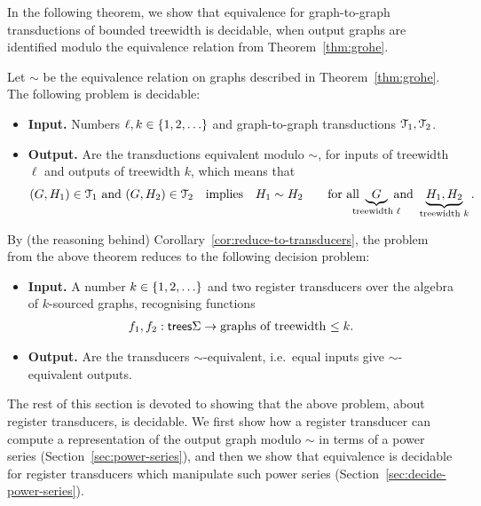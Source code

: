 In the following theorem, we show that equivalence for graph-to-graph \mso transductions of bounded treewidth is decidable, when output graphs are identified modulo the equivalence relation from Theorem~\ref{thm:grohe}. 
\begin{theorem}\label{thm:path-equivalence}
    Let $\sim$ be the equivalence relation on graphs described in Theorem~\ref{thm:grohe}. 
    The following problem is decidable:
    \begin{itemize}
        \item {\bf Input.} Numbers $\ell, k \in \{1,2,\ldots\}$ and  graph-to-graph \mso transductions $\mathcal T_1,\mathcal T_2$.
        \item {\bf Output.} Are the transductions equivalent modulo $\sim$, for inputs of treewidth $\ell$ and outputs of treewidth $k$, which means that
        \begin{align*}
        (G,H_1) \in \Tt_1 \text{ and } (G,H_2) \in \Tt_2 \quad \text{implies} \quad H_1 \sim H_2  \qquad \text{for all }\myunderbrace{G}{treewidth $\ell$} \text{ and } \underbrace{H_1,H_2}_{\text{treewidth $k$}}.
        \end{align*}
    \end{itemize}
\end{theorem}
 By (the reasoning behind) Corollary~\ref{cor:reduce-to-transducers}, the problem from the above theorem reduces to the following decision problem:
 \smallskip

\begin{itemize}
    \item {\bf Input.} A number $k \in \{1,2,\ldots\}$ and two register transducers over the algebra of $k$-sourced graphs, recognising functions
    \begin{align*}
    f_1,f_2 : {\mathsf{trees}} \Sigma \to \text{graphs of treewidth $\le k$}.
    \end{align*}
    \item {\bf Output.} Are the transducers $\sim$-equivalent, i.e.~equal inputs give $\sim$-equivalent outputs.
\end{itemize}
\smallskip
 
The rest of this section is devoted to showing that the above problem, about register transducers, is decidable. We first show how a register transducer can compute a representation of the output graph modulo $\sim$ in terms of a power series (Section~\ref{sec:power-series}), and then we show that equivalence is decidable for register transducers which manipulate such power series (Section~\ref{sec:decide-power-series}).

